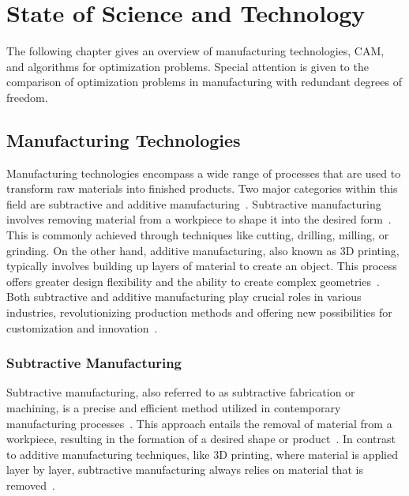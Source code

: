 \chapter{State of Science and Technology}%
The following chapter gives an overview of manufacturing technologies, CAM, and algorithms for optimization problems. Special attention is given to the comparison of optimization problems in manufacturing with redundant degrees of freedom. 


\section{Manufacturing Technologies}
Manufacturing technologies encompass a wide range of processes that are used to transform raw materials into finished products. Two major categories within this field are subtractive and additive manufacturing~\cite{Iqbal.2020}. Subtractive manufacturing involves removing material from a workpiece to shape it into the desired form~\cite{Watson.2015}. This is commonly achieved through techniques like cutting, drilling, milling, or grinding. On the other hand, additive manufacturing, also known as 3D printing, typically involves building up layers of material to create an object. This process offers greater design flexibility and the ability to create complex geometries~\cite{Dilberoglu.2017}. Both subtractive and additive manufacturing play crucial roles in various industries, revolutionizing production methods and offering new possibilities for customization and innovation~\cite{Bandyopadhyay.2020, vanLe.2017}.











\subsection{Subtractive Manufacturing}
Subtractive manufacturing, also referred to as subtractive fabrication or machining, is a precise and efficient method utilized in contemporary manufacturing processes~\cite{Wang.2023}. This approach entails the removal of material from a workpiece, resulting in the formation of a desired shape or product~\cite{Calleja.2018}. In contrast to additive manufacturing techniques, like 3D printing, where material is applied layer by layer, subtractive manufacturing always relies on material that is removed~\cite{Abdulhameed.2019}.

